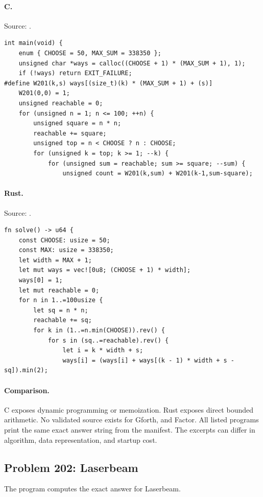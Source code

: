 \paragraph{C.} Source: .
\begin{lstlisting}
int main(void) {
    enum { CHOOSE = 50, MAX_SUM = 338350 };
    unsigned char *ways = calloc((CHOOSE + 1) * (MAX_SUM + 1), 1);
    if (!ways) return EXIT_FAILURE;
#define W201(k,s) ways[(size_t)(k) * (MAX_SUM + 1) + (s)]
    W201(0,0) = 1;
    unsigned reachable = 0;
    for (unsigned n = 1; n <= 100; ++n) {
        unsigned square = n * n;
        reachable += square;
        unsigned top = n < CHOOSE ? n : CHOOSE;
        for (unsigned k = top; k >= 1; --k) {
            for (unsigned sum = reachable; sum >= square; --sum) {
                unsigned count = W201(k,sum) + W201(k-1,sum-square);
\end{lstlisting}

\paragraph{Rust.} Source: .
\begin{lstlisting}
fn solve() -> u64 {
    const CHOOSE: usize = 50;
    const MAX: usize = 338350;
    let width = MAX + 1;
    let mut ways = vec![0u8; (CHOOSE + 1) * width];
    ways[0] = 1;
    let mut reachable = 0;
    for n in 1..=100usize {
        let sq = n * n;
        reachable += sq;
        for k in (1..=n.min(CHOOSE)).rev() {
            for s in (sq..=reachable).rev() {
                let i = k * width + s;
                ways[i] = (ways[i] + ways[(k - 1) * width + s - sq]).min(2);
\end{lstlisting}

\paragraph{Comparison.}
C exposes dynamic programming or memoization. Rust exposes direct bounded arithmetic.
No validated source exists for Gforth, and Factor.
All listed programs print the same exact answer string from the manifest. The excerpts can differ in algorithm, data representation, and startup cost.

\subsection{Problem 202: Laserbeam}
\label{walkthrough:p202}
The program computes the exact answer for Laserbeam.

